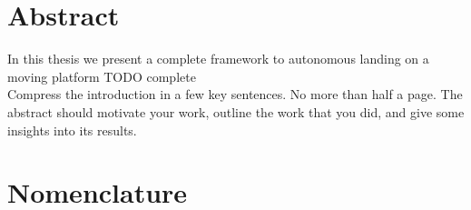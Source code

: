 
 \setcounter{tocdepth}{2}
 \tableofcontents
 \cleardoublepage






\chapter*{Abstract}
In this thesis we present a complete framework to autonomous landing on a moving platform
TODO complete \\
  Compress the introduction in a few key sentences. No more than half a page. The abstract should motivate your work, outline the work that you did, and give some insights into its results.

 \cleardoublepage


\chapter*{Nomenclature}\label{chap:symbole}

